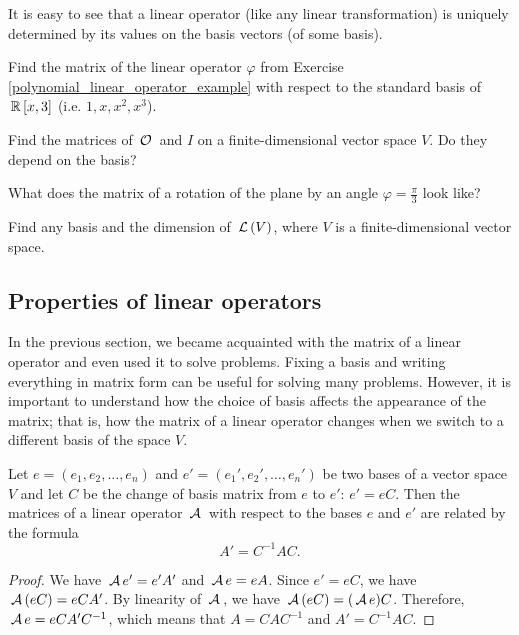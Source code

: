 \begin{remark}
It is easy to see that a linear operator (like any linear transformation) is uniquely determined by its values on the basis vectors (of some basis).
\end{remark}

\begin{exercise}
Find the matrix of the linear operator $\varphi$ from Exercise \ref{polynomial_linear_operator_example} with respect to the standard basis of $\,\mathbb{R}\,[x, 3]$ (i.e. $1, x, x^2, x^3$).
\end{exercise}

\begin{exercise}
Find the matrices of $\,\mathcal{O}\,$ and $I$ on a finite-dimensional vector space $V$. Do they depend on the basis?
\end{exercise}

\begin{exercise}
What does the matrix of a rotation of the plane by an angle $\varphi = \frac{\pi}{3}$ look like?
\end{exercise}

\begin{exercise}
Find any basis and the dimension of $\,\mathcal{L}\,(V)$, where $V$ is a finite-dimensional vector space.
\end{exercise}

\subsection{Properties of linear operators}

In the previous section, we became acquainted with the matrix of a linear operator and even used it to solve problems. Fixing a basis and writing everything in matrix form can be useful for solving many problems. However, it is important to understand how the choice of basis affects the appearance of the matrix; that is, how the matrix of a linear operator changes when we switch to a different basis of the space $V$.

\begin{lemma}
Let $e = (e_1, e_2, \dots, e_n)$ and $e' = (e_1', e_2', \dots, e_n')$ be two bases of a vector space $V$ and let $C$ be the change of basis matrix from $e$ to $e'$: $e' = e C$. Then the matrices of a linear operator $\,\mathcal{A}\,$ with respect to the bases $e$ and $e'$ are related by the formula
$$
A' = C^{-1} A C.
$$
\end{lemma}
\begin{proof}
We have $\,\mathcal{A}\, e' = e' A'$ and $\,\mathcal{A}\, e = e A$. Since $e' = e C$, we have $\,\mathcal{A}\,(eC) = e C A'$. By linearity of $\,\mathcal{A}\,$, we have $\,\mathcal{A}\,(eC) =(\,\mathcal{A}\, e) C$. Therefore, $\,\mathcal{A}\, e = e C A' C^{-1}$, which means that $A = C A C^{-1}$ and $A' = C^{-1} A C$.
\end{proof}


